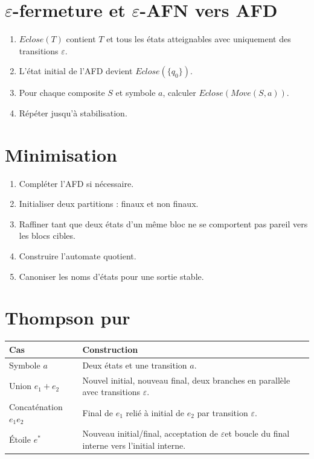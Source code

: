 \documentclass[11pt,a4paper]{report}
\newcommand{\eps}{\ensuremath{\varepsilon}}
\begin{document}
\section{\eps-fermeture et \eps-AFN vers AFD}
\begin{enumerate}
  \item $Eclose(T)$ contient $T$ et tous les états atteignables avec uniquement des transitions \eps.
  \item L'état initial de l'AFD devient $Eclose(\{q_0\})$.
  \item Pour chaque composite $S$ et symbole $a$, calculer $Eclose(Move(S,a))$.
  \item Répéter jusqu'à stabilisation.
\end{enumerate}

\section{Minimisation}
\begin{enumerate}
  \item Compléter l'AFD si nécessaire.
  \item Initialiser deux partitions : finaux et non finaux.
  \item Raffiner tant que deux états d'un même bloc ne se comportent pas pareil vers les blocs cibles.
  \item Construire l'automate quotient.
  \item Canoniser les noms d'états pour une sortie stable.
\end{enumerate}

\section{Thompson pur}
\begin{longtable}{p{}p{}}
\toprule
\textbf{Cas} & \textbf{Construction}\\
\midrule
Symbole $a$ & Deux états et une transition $a$.\\
Union $e_1+e_2$ & Nouvel initial, nouveau final, deux branches en parallèle avec transitions \eps.\\
Concaténation $e_1e_2$ & Final de $e_1$ relié à initial de $e_2$ par transition \eps.\\
Étoile $e^*$ & Nouveau initial/final, acceptation de \eps et boucle du final interne vers l'initial interne.\\
\bottomrule
\end{longtable}
\end{document}
